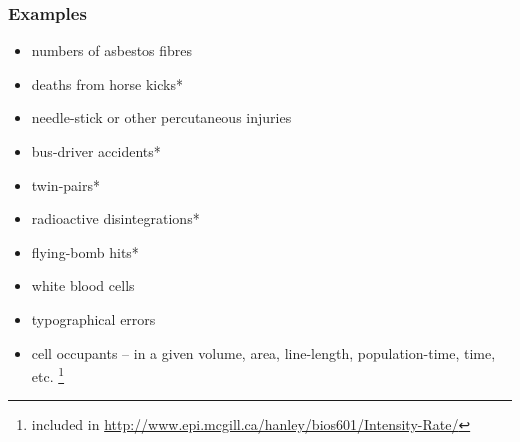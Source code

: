 \documentclass[10pt]{beamer}\usepackage[]{graphicx}\usepackage[]{color}
\begin{document}
\begin{frame}
	\frametitle{Examples}
	
	\begin{itemize}
		\setlength\itemsep{0.5em}
		\item numbers of asbestos fibres
		\item deaths from horse kicks*
		\item needle-stick or other percutaneous injuries
		\item bus-driver accidents*
		\item twin-pairs*
		\item radioactive disintegrations*
		\item flying-bomb hits*
		\item white blood cells
		\item typographical errors
		\item cell occupants -- in a given volume, area, line-length, population-time, time, etc. 
		\footnote{\footnotesize * included in \url{http://www.epi.mcgill.ca/hanley/bios601/Intensity-Rate/}}
	\end{itemize}
\end{frame}
\end{document}
